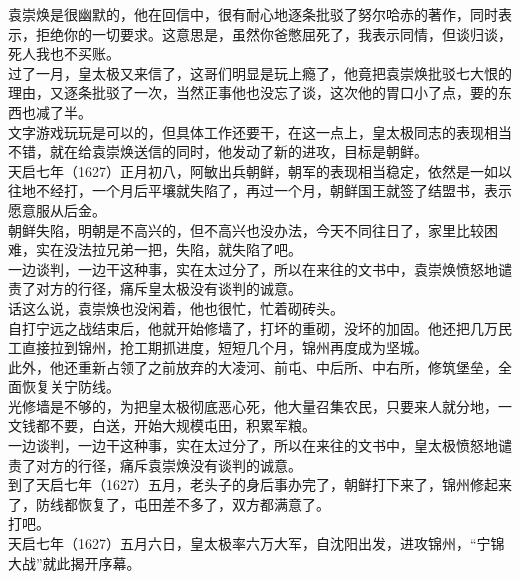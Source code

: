 \begin{multicols}{\theparacolNo}
袁崇焕是很幽默的，他在回信中，很有耐心地逐条批驳了努尔哈赤的著作，同时表示，拒绝你的一切要求。这意思是，虽然你爸憋屈死了，我表示同情，但谈归谈，死人我也不买账。\\

过了一月，皇太极又来信了，这哥们明显是玩上瘾了，他竟把袁崇焕批驳七大恨的理由，又逐条批驳了一次，当然正事他也没忘了谈，这次他的胃口小了点，要的东西也减了半。\\

文字游戏玩玩是可以的，但具体工作还要干，在这一点上，皇太极同志的表现相当不错，就在给袁崇焕送信的同时，他发动了新的进攻，目标是朝鲜。\\

天启七年（1627）正月初八，阿敏出兵朝鲜，朝军的表现相当稳定，依然是一如以往地不经打，一个月后平壤就失陷了，再过一个月，朝鲜国王就签了结盟书，表示愿意服从后金。\\

朝鲜失陷，明朝是不高兴的，但不高兴也没办法，今天不同往日了，家里比较困难，实在没法拉兄弟一把，失陷，就失陷了吧。\\

一边谈判，一边干这种事，实在太过分了，所以在来往的文书中，袁崇焕愤怒地谴责了对方的行径，痛斥皇太极没有谈判的诚意。\\

话这么说，袁崇焕也没闲着，他也很忙，忙着砌砖头。\\

自打宁远之战结束后，他就开始修墙了，打坏的重砌，没坏的加固。他还把几万民工直接拉到锦州，抢工期抓进度，短短几个月，锦州再度成为坚城。\\

此外，他还重新占领了之前放弃的大凌河、前屯、中后所、中右所，修筑堡垒，全面恢复关宁防线。\\

光修墙是不够的，为把皇太极彻底恶心死，他大量召集农民，只要来人就分地，一文钱都不要，白送，开始大规模屯田，积累军粮。\\

一边谈判，一边干这种事，实在太过分了，所以在来往的文书中，皇太极愤怒地谴责了对方的行径，痛斥袁崇焕没有谈判的诚意。\\

到了天启七年（1627）五月，老头子的身后事办完了，朝鲜打下来了，锦州修起来了，防线都恢复了，屯田差不多了，双方都满意了。\\

打吧。\\

天启七年（1627）五月六日，皇太极率六万大军，自沈阳出发，进攻锦州，“宁锦大战”就此揭开序幕。\\


\end{multicols}
